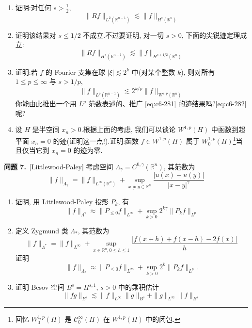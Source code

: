 \begin{enumerate}
\renewcommand{\labelenumi}{\roman{enumi}.}
\item 证明:对任何 $s > \frac{1}{2}$,
\begin{equation}
\|Rf\|_{L^2(\mathbb{R}^{n-1})} \lesssim \|f\|_{H^s(\mathbb{R}^n)}\label{eq:c6-281}
\end{equation}
\item 证明该结果对 $s \leq 1/2$ 不成立.不过要证明, 对一切 $s > 0$, 下面的尖锐迹定理成立:
\begin{equation}
\|Rf\|_{H^s(\mathbb{R}^{n-1})} \lesssim \|f\|_{H^{s+1/2}(\mathbb{R}^n)}\label{eq:c6-282}
\end{equation}
\item 证明:若 $f$ 的 Fourier 支集在球 $|\xi| \lesssim 2^k$ 中(对某个整数 $k$), 则对所有 $1 \leq p \leq \infty$ 与 $s > 1/p$,
\[
\|f\|_{L^p(\mathbb{R}^{n-1})} \lesssim 2^{k/p} \|f\|_{W^{s, p}(\mathbb{R}^n)}
\]
你能由此推出一个用 $L^p$ 范数表述的、推广 \eqref{eq:c6-281} 的迹结果吗?\eqref{eq:c6-282} 呢?
\item 设 $H$ 是半空间 $x_n > 0$.根据上面的考虑, 我们可以谈论 $W^{1, p}(H)$ 中函数到超平面 $x_n = 0$ 的迹(证明这一点!).证明:函数 $f \in W^{1, p}(H)$ 属于 $W_0^{1, p}(H)$\footnote{回忆 $W_0^{1, p}(H)$ 是 $\mathcal{C}_0^\infty(H)$ 在 $W^{1, p}(H)$ 中的闭包.}当且仅当它到 $x_n = 0$ 的迹为零.
\end{enumerate}

\noindent\textbf{问题 7.}~[Littlewood-Paley] 考虑空间 $\Lambda_\gamma = C^{0, \gamma}(\mathbb{R}^n)$, 其范数为
\[
\|f\|_{\Lambda_\gamma} = \|f\|_{L^\infty(\mathbb{R}^n)} + \sup_{x \neq y \in \mathbb{R}^n} \frac{|u(x) - u(y)|}{|x - y|^\gamma}
\]
\begin{enumerate}
\renewcommand{\labelenumi}{\roman{enumi}.}
\item 证明, 用 Littlewood-Paley 投影 $P_k$, 有
\[
\|f\|_{\Lambda^\gamma} \approx \|P_{\leq 0} f\|_{L^\infty} + \sup_{k > 0} 2^{k\gamma} \|P_k f\|_{L^p}
\]
\item 定义 Zygmund 类 $\Lambda_*$, 其范数为
\[
\|f\|_{\Lambda^*} = \|f\|_{L^\infty} + \sup_{x \in \mathbb{R}^n, 0 \leq h \leq 1} \frac{|f(x+h) + f(x-h) - 2f(x)|}{h}
\]
证明
\[
\|f\|_{\Lambda_*} \approx \|P_{\leq 0} f\|_{L^\infty} + \sup_{k > 0} 2^k \|P_k f\|_{L^p}.
\]
\item 证明 Besov 空间 $B^s = H^{s, 1}$, $s > 0$ 中的乘积估计
\[
\|fg\|_{B^s} \lesssim \|f\|_{L^\infty} \|g\|_{B^s} + \|g\|_{L^\infty} \|f\|_{B^s}
\]
\end{enumerate}

